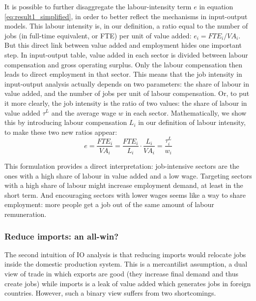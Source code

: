 It is possible to further disaggregate the labour-intensity term $e$ in equation \ref{eq:result1_simplified}, in order to better reflect the mechanisms in input-output models. 
This labour intensity is, in our definition, a ratio equal to the number of jobs (in full-time equivalent, or FTE) per unit of value added: $e_i = FTE_i/VA_i$. 
But this direct link between value added and employment hides one important step. In input-output table, value added in each sector is divided between labour compensation and gross operating surplus. Only the labour compensation then leads to direct employment in that sector.
This means that the job intensity in input-output analysis actually depends on two parameters: the share of labour in value added, and the number of jobs per unit of labour compensation. Or, to put it more clearly, the job intensity is the ratio of two values: the share of labour in value added $\tau^L$ and the average wage $w$ in each sector.
Mathematically, we show this by introducing labour compensation $L_i$ in our definition of labour intensity, to make these two new ratios appear:
\begin{equation}
e = \frac{FTE_i}{VA_i} = \frac{FTE_i}{L_i} \cdot \frac{L_i}{VA_i} = \frac{\tau^L_i}{w_i}
\label{eq:job_intensity_decomp}
\end{equation}

This formulation provides a direct interpretation: job-intensive sectors are the ones with a high share of labour in value added and a low wage.
Targeting sectors with a high share of labour might increase employment demand, at least in the short term. 
And encouraging sectors with lower wages seems like a way to share employment: more people get a job out of the same amount of labour remuneration.

\subsubsection{Reduce imports: an all-win?}

The second intuition of IO analysis is that reducing imports would relocate jobs inside the domestic production system. 
This is a mercantilist assumption, a dual view of trade in which exports are good (they increase final demand and thus create jobs) while imports is a leak of value added which generates jobs in foreign countries.
However, such a binary view suffers from two shortcomings. 


